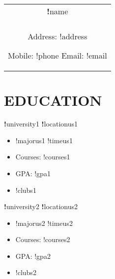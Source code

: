 \documentclass[a4paper,8pt]{article}
\begin{document}
    \pagestyle{empty}
    
    
    \begin{tabularx}{\linewidth}{@{} C @{}}
    \Huge\textbf !name \\[6pt]
    \\
    Address: !address
    
    Mobile: !phone
    Email: !email
    \end{tabularx}
    
    \section{EDUCATION}
    \textbf !university1 \hfill \textbf !locationus1 \\[-3ex]
    \begin{itemize}[label={\large\textbullet}, left=0pt, itemsep=0.5ex, parsep=0.5ex]
        \item !majorus1 \hfill !timeus1 \\[-3ex]
    \end{itemize}
    \begin{itemize}[label=$\circ$,itemsep=0.5ex,parsep=0.5ex]
        \item Courses: !courses1
        \item GPA: !gpa1
        \item !clubs1
    \end{itemize}
    
    \textbf !university2 \hfill \textbf !locationus2 \\[-3ex]
    \begin{itemize}[label={\large\textbullet}, left=0pt, itemsep=0.5ex, parsep=0.5ex]
        \item !majorus2 \hfill  !timeus2 \\[-3ex]
    \end{itemize}
    \begin{itemize}[label=$\circ$,itemsep=0.5ex,parsep=0.5ex]
        \item Courses: !courses2
        \item GPA: !gpa2
        \item !clubs2
    \end{itemize}
    
\end{document}
